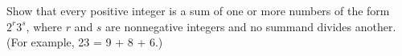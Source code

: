 Show that every positive integer is a sum of one or more numbers of the
form $2^r 3^s$, where $r$ and $s$ are nonnegative integers and no
summand divides another.
(For example, 23 = 9 + 8 + 6.)
